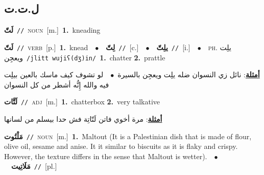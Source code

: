 \documentclass[10pt,a4paper,twoside]{article} %
\begin{document}
\begin{multicols}{2}
\vspace{-3mm}
\subsection*{\color{blue}\foreignlanguage{arabic}{ل.ت.ت}\color{blue}{}} 

{\setlength\topsep{0pt}\textbf{\foreignlanguage{arabic}{لَتّ}}\ {\color{gray}\texttt{//}\color{black}}\ \textsc{noun}\ [m.]\ \textbf{1.}~kneading\ } \vspace{2mm}

{\setlength\topsep{0pt}\textbf{\foreignlanguage{arabic}{لَتّ}}\ {\color{gray}\texttt{//}\color{black}}\ \textsc{verb}\ [p.]\ \textbf{1.}~knead\ \ $\bullet$\ \ \setlength\topsep{0pt}\textbf{\foreignlanguage{arabic}{لِتّ}}\ {\color{gray}\texttt{//}\color{black}}\ [c.]\ \ $\bullet$\ \ \setlength\topsep{0pt}\textbf{\foreignlanguage{arabic}{يلِتّ}}\ {\color{gray}\texttt{//}\color{black}}\ [i.]\ \ $\bullet$\ \ \textsc{ph.} \color{gray} \foreignlanguage{arabic}{يلِت ويعجِن}\color{black}\ {\color{gray}\texttt{/{\sffamily jlitt wujiʕ(dʒ)in}/}\color{black}}\ \textbf{1.}~chatter  \textbf{2.}~prattle\  \begin{flushright}\color{gray}\foreignlanguage{arabic}{\textbf{\underline{\foreignlanguage{arabic}{أمثلة}}}: نائل زي النسوان ضله يلِت ويعجِن بالسيرة\ $\bullet$\ \  لو تشوف كيف ماسك بالعين بيلِت فيه والله إِنُّه أشطر من كل النسوان}\end{flushright}\color{black}} \vspace{2mm}

{\setlength\topsep{0pt}\textbf{\foreignlanguage{arabic}{لَتَّات}}\ {\color{gray}\texttt{//}\color{black}}\ \textsc{adj}\ [m.]\ \textbf{1.}~chatterbox  \textbf{2.}~very talkative\  \begin{flushright}\color{gray}\foreignlanguage{arabic}{\textbf{\underline{\foreignlanguage{arabic}{أمثلة}}}: مرة أخوي فاتن لَتّاتِة فش حدا بيسلم من لسانها}\end{flushright}\color{black}} \vspace{2mm}

{\setlength\topsep{0pt}\textbf{\foreignlanguage{arabic}{مَلْتُوت}}\ {\color{gray}\texttt{//}\color{black}}\ \textsc{noun}\ [m.]\ \textbf{1.}~Maltout (It is a Palestinian dish that is made of flour, olive oil, sesame and anise. It it similar to biscuits as it is flaky and crispy. However, the texture differs in the sense that Maltout is wetter).\ \ $\bullet$\ \ \setlength\topsep{0pt}\textbf{\foreignlanguage{arabic}{مَلَاتِيت}}\ {\color{gray}\texttt{//}\color{black}}\ [pl.]\ } \vspace{2mm}


\end{multicols}
\end{document}
